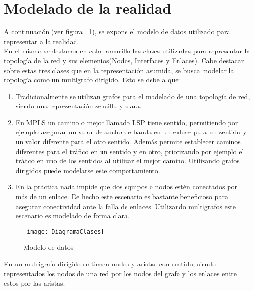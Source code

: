 
\section[Modelado de la realidad]{Modelado de la realidad}

A continuaci\'on (ver figura ~\ref{fig:ModeloDeDatos}), se expone el modelo de datos utilizado para representar a la realidad.\\

En el mismo se destacan en color amarillo las clases utilizadas para representar la topolog\'ia de la red y sus elementos(Nodos, Interfaces y Enlaces). Cabe destacar sobre estas tres clases que en la representaci\'on asumida, se busca modelar la topolog\'ia como un multigrafo dirigido. Esto se debe a que:

\begin{enumerate}
\item Tradicionalmente se utilizan grafos para el modelado de una topolog\'ia de red, siendo una representaci\'on sencilla y clara.

\item En MPLS un camino o mejor llamado LSP tiene sentido, permitiendo por ejemplo asegurar un valor de ancho de banda en un enlace para un sentido y un valor diferente para el otro sentido. Adem\'as permite establecer caminos diferentes para el tr\'afico en un sentido y en otro, priorizando por ejemplo el tr\'afico  en uno de los sentidos al utilizar el mejor camino. Utilizando grafos dirigidos puede modelarse este comportamiento.

\item En la pr\'actica nada impide que dos equipos o nodos est\'en conectados por m\'as de un enlace. De hecho este escenario es bastante beneficioso para asegurar conectividad ante la falla de enlaces. Utilizando multigrafos este escenario es modelado de forma clara.
  
\end{enumerate}

\begin{figure}[ht!] 
\centering    
\texttt{[image: DiagramaClases]}
\caption[Modelo de datos]{Modelo de datos}
\label{fig:ModeloDeDatos}
\end{figure}

En un mulrigrafo dirigido se tienen nodos y aristas con sentido; siendo representados los nodos de una red por los nodos del grafo y los enlaces entre estos por las aristas.

